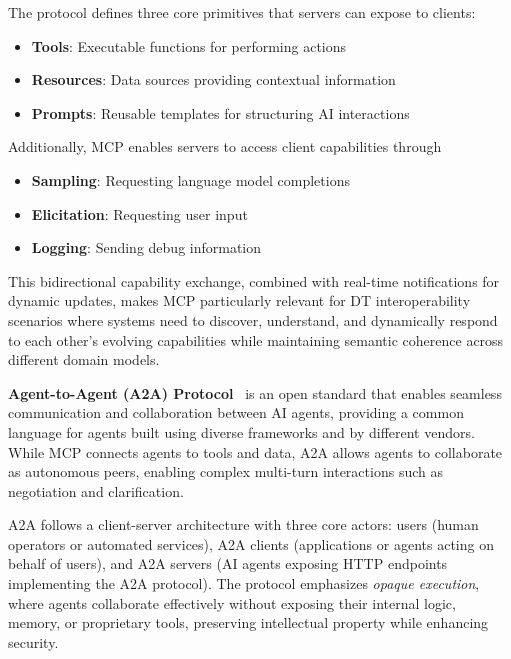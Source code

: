 The protocol defines three core primitives that servers can expose to clients:
\begin{itemize}
    \item \textbf{Tools}: Executable functions for performing actions
    \item \textbf{Resources}: Data sources providing contextual information
    \item \textbf{Prompts}: Reusable templates for structuring AI interactions
\end{itemize}
Additionally, MCP enables servers to access client capabilities through
\begin{itemize}
    \item \textbf{Sampling}: Requesting language model completions
    \item \textbf{Elicitation}: Requesting user input
    \item \textbf{Logging}: Sending debug information
\end{itemize}
This bidirectional capability exchange, combined with real-time notifications for dynamic updates,
    makes MCP particularly relevant for DT interoperability scenarios where
    systems need to discover, understand, and dynamically respond to each other's evolving capabilities
    while maintaining semantic coherence across different domain models.

\textbf{Agent-to-Agent (A2A) Protocol}~\cite{Google_A2A_2025}
    is an open standard that enables seamless communication and collaboration between AI agents, providing a
    common language for agents built using diverse frameworks and by different vendors.
While MCP connects agents to tools and data,
    A2A allows agents to collaborate as autonomous peers,
    enabling complex multi-turn interactions such as negotiation and clarification.

A2A follows a client-server architecture with three core actors:
    users (human operators or automated services),
    A2A clients (applications or agents acting on behalf of users), and
    A2A servers (AI agents exposing HTTP endpoints implementing the A2A protocol).
The protocol emphasizes \emph{opaque execution}, where
    agents collaborate effectively without exposing their internal logic, memory, or proprietary tools,
    preserving intellectual property while enhancing security.

